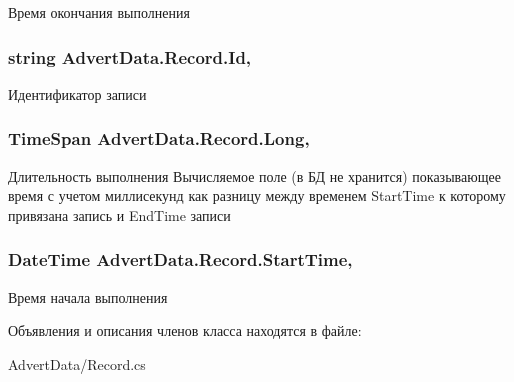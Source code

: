 Время окончания выполнения 

\hypertarget{class_advert_data_1_1_record_a07f38726ac87b12bc78813719ab011cc}{
\subsubsection[{Id}]{\setlength{\rightskip}{0pt plus 5cm}string Advert\+Data.\+Record.\+Id\hspace{0.3cm}{\ttfamily [get]}, {\ttfamily [set]}}}\label{class_advert_data_1_1_record_a07f38726ac87b12bc78813719ab011cc}


Идентификатор записи 

\hypertarget{class_advert_data_1_1_record_a43cfdb4200976b189f903bda0f0fd7e0}{
\subsubsection[{Long}]{\setlength{\rightskip}{0pt plus 5cm}Time\+Span Advert\+Data.\+Record.\+Long\hspace{0.3cm}{\ttfamily [get]}, {\ttfamily [set]}}}\label{class_advert_data_1_1_record_a43cfdb4200976b189f903bda0f0fd7e0}


Длительность выполнения Вычисляемое поле (в БД не хранится) показывающее время с учетом миллисекунд как разницу между временем Start\+Time к которому привязана запись и End\+Time записи 

\hypertarget{class_advert_data_1_1_record_aae8675dc3bd9625fda7af9e03e1b95ee}{
\subsubsection[{Start\+Time}]{\setlength{\rightskip}{0pt plus 5cm}Date\+Time Advert\+Data.\+Record.\+Start\+Time\hspace{0.3cm}{\ttfamily [get]}, {\ttfamily [set]}}}\label{class_advert_data_1_1_record_aae8675dc3bd9625fda7af9e03e1b95ee}


Время начала выполнения 



Объявления и описания членов класса находятся в файле\+:\begin{DoxyCompactItemize}
\item 
Advert\+Data/Record.\+cs\end{DoxyCompactItemize}
